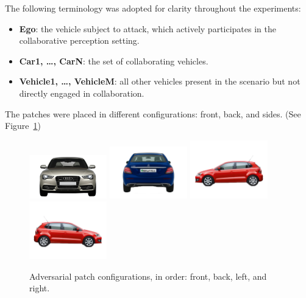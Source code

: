 The following terminology was adopted for clarity throughout the experiments:
\begin{itemize}
    \item \textbf{Ego}: the vehicle subject to attack, which actively participates in the collaborative perception setting.
    \item \textbf{Car1, \ldots, CarN}: the set of collaborating vehicles.
    \item \textbf{Vehicle1, \ldots, VehicleM}: all other vehicles present in the scenario but not directly engaged in collaboration.
\end{itemize}

The patches were placed in different configurations: front, back, and sides. (See Figure~\ref{fig:patch_configurations})
\begin{figure}[ht]
    \centering
    \includegraphics[width=0.3\textwidth]{figures/experiments/patch/front.png}
    \includegraphics[width=0.3\textwidth]{figures/experiments/patch/back.png}
    \includegraphics[width=0.3\textwidth]{figures/experiments/patch/left.png}
    \includegraphics[width=0.3\textwidth]{figures/experiments/patch/right.png}
    \caption{Adversarial patch configurations, in order: front, back, left, and right.}
    \label{fig:patch_configurations}
\end{figure}

